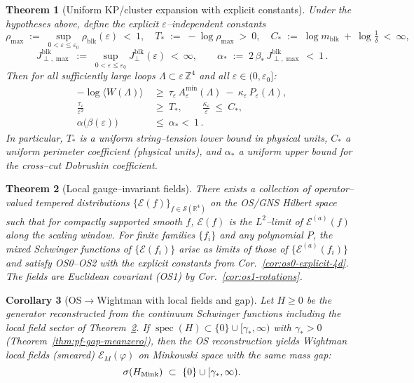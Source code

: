 \documentclass[11pt]{amsart}
\theoremstyle{plain}
\newtheorem{theorem}{Theorem}[section]
\newtheorem{corollary}[theorem]{Corollary}
\theoremstyle{definition}
\theoremstyle{remark}
\begin{document}
\begin{theorem}[Uniform KP/cluster expansion with explicit constants]
\label{thm:uniform-kp}
Under the hypotheses above, define the explicit $\varepsilon$–independent constants
\[
  \rho_{\max}\;:=\;\sup_{0<\varepsilon\le \varepsilon_0}\rho_{\mathrm{blk}}(\varepsilon)\ <\ 1,\quad
  T_*\;:=\; -\log \rho_{\max}\ >\ 0,\quad
  C_*\;:=\; \log m_{\mathrm{blk}}\ +\ \log\tfrac{1}{\delta}\ <\ \infty,
\]
\[
  J^{\mathrm{blk}}_{\perp,\max}\;:=\;\sup_{0<\varepsilon\le\varepsilon_0} J^{\mathrm{blk}}_{\perp}(\varepsilon)\ <\ \infty,\qquad
  \alpha_*\;:=\;2\,\beta_*\,J^{\mathrm{blk}}_{\perp,\max}\ <\ 1\,.
\]
Then for all sufficiently large loops $\Lambda\subset\varepsilon\,\mathbb Z^4$ and all $\varepsilon\in(0,\varepsilon_0]$:
\begin{align}
  -\log\langle W(\Lambda)\rangle\ &\ge\ \tau_\varepsilon\,A_\varepsilon^{\min}(\Lambda)\ -\ \kappa_\varepsilon\,P_\varepsilon(\Lambda),\\
  \frac{\tau_\varepsilon}{\varepsilon^2}\ &\ge\ T_*,\qquad \frac{\kappa_\varepsilon}{\varepsilon}\ \le\ C_*,\\
  \alpha\bigl(\beta(\varepsilon)\bigr)\ &\le\ \alpha_* <\ 1\,.
\end{align}
In particular, $T_*$ is a uniform string–tension lower bound in physical units, $C_*$ a uniform perimeter coefficient (physical units), and $\alpha_*$ a uniform upper bound for the cross–cut Dobrushin coefficient.
\end{theorem}
 

\begin{theorem}[Local gauge–invariant fields]\label{thm:local-fields-exist}
There exists a collection of operator–valued tempered distributions $\{\mathcal E(f)\}_{f\in \mathcal S(\mathbb R^4)}$ on the OS/GNS Hilbert space such that for compactly supported smooth $f$, $\mathcal E(f)$ is the $L^2$–limit of $\mathcal E^{(a)}(f)$ along the scaling window. For finite families $\{f_i\}$ and any polynomial $P$, the mixed Schwinger functions of $\{\mathcal E(f_i)\}$ arise as limits of those of $\{\mathcal E^{(a)}(f_i)\}$ and satisfy OS0–OS2 with the explicit constants from Cor.~\ref{cor:os0-explicit-4d}. The fields are Euclidean covariant (OS1) by Cor.~\ref{cor:os1-rotations}.
\end{theorem}

\begin{corollary}[OS$\to$Wightman with local fields and gap]\label{cor:wightman-local-gap}
Let $H\ge 0$ be the generator reconstructed from the continuum Schwinger functions including the local field sector of Theorem~\ref{thm:local-fields-exist}. If $\operatorname{spec}(H)\subset\{0\}\cup[\gamma_*,\infty)$ with $\gamma_*>0$ (Theorem~\ref{thm:pf-gap-meanzero}), then the OS reconstruction yields Wightman local fields (smeared) $\mathcal E_M(\varphi)$ on Minkowski space with the same mass gap:
\[
  \sigma(H_{\rm Mink})\ \subset\ \{0\}\cup[\gamma_*,\infty).
\]
\end{corollary}
\end{document}
